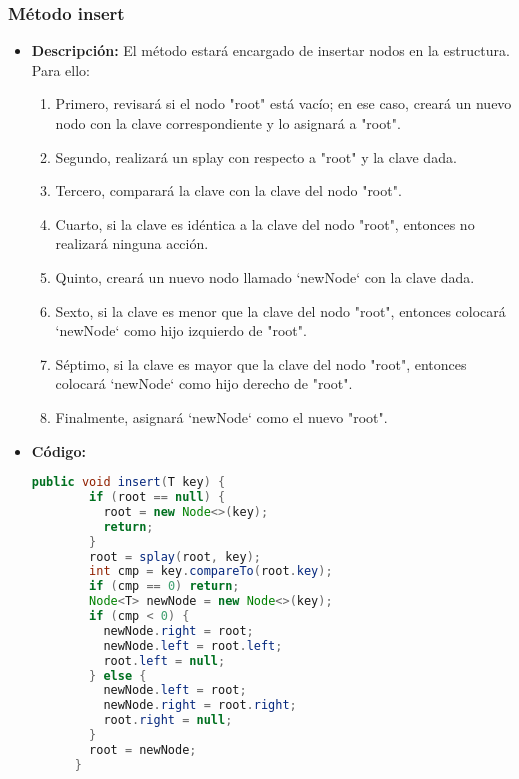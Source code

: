 \documentclass{article}
\begin{document}

  \subsubsection{Método insert}
  \begin{itemize}
    \item \textbf{Descripción: }El método estará encargado de insertar nodos en la estructura. Para ello:
    \begin{enumerate}
      \item Primero, revisará si el nodo "root" está vacío; en ese caso, creará un nuevo nodo con la clave correspondiente y lo asignará a "root".
      \item Segundo, realizará un splay con respecto a "root" y la clave dada.
      \item Tercero, comparará la clave con la clave del nodo "root".
      \item Cuarto, si la clave es idéntica a la clave del nodo "root", entonces no realizará ninguna acción.
      \item Quinto, creará un nuevo nodo llamado `newNode` con la clave dada.
      \item Sexto, si la clave es menor que la clave del nodo "root", entonces colocará `newNode` como hijo izquierdo de "root".
      \item Séptimo, si la clave es mayor que la clave del nodo "root", entonces colocará `newNode` como hijo derecho de "root".
      \item Finalmente, asignará `newNode` como el nuevo "root".
    \end{enumerate}
    \item \textbf{Código: }
    \begin{lstlisting}[language=Java, caption={Método insert}]
      public void insert(T key) {
        if (root == null) {
          root = new Node<>(key);
          return;
        }
        root = splay(root, key);
        int cmp = key.compareTo(root.key);
        if (cmp == 0) return;
        Node<T> newNode = new Node<>(key);
        if (cmp < 0) {
          newNode.right = root;
          newNode.left = root.left;
          root.left = null;
        } else {
          newNode.left = root;
          newNode.right = root.right;
          root.right = null;
        }
        root = newNode;
      }
    \end{lstlisting}
  \end{itemize}

\end{document}

